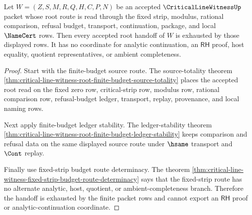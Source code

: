 \begin{theorem}
\label{thm:critical-line-witness-root-handoff-exhaustion}
Let $W=(Z,S,M,R,Q,H,C,P,N)$ be an accepted $\CriticalLineWitnessUp$ packet whose root route is read through the fixed strip, modulus, rational comparison, refusal budget, transport, continuation, package, and local $\NameCert$ rows. Then every accepted root handoff of $W$ is exhausted by those displayed rows. It has no coordinate for analytic continuation, an $\mathsf{RH}$ proof, host equality, quotient representatives, or ambient completeness.
\end{theorem}
\begin{proof}
Start with the finite-budget source route. The source-totality theorem \autoref{thm:critical-line-witness-root-finite-budget-source-totality} places the accepted root read on the fixed zero row, critical-strip row, modulus row, rational comparison row, refusal-budget ledger, transport, replay, provenance, and local naming rows.

Next apply finite-budget ledger stability. The ledger-stability theorem \autoref{thm:critical-line-witness-root-finite-budget-ledger-stability} keeps comparison and refusal data on the same displayed source route under $\hsame$ transport and $\Cont$ replay.

Finally use fixed-strip budget route determinacy. The theorem \autoref{thm:critical-line-witness-fixed-strip-budget-route-determinacy} says that the fixed-strip route has no alternate analytic, host, quotient, or ambient-completeness branch. Therefore the handoff is exhausted by the finite packet rows and cannot export an $\mathsf{RH}$ proof or analytic-continuation coordinate.
\end{proof}

